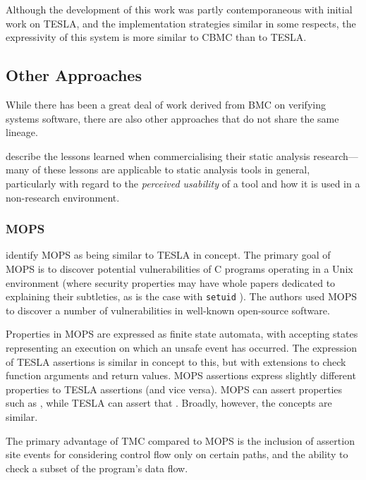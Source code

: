 Although the development of this work was partly contemporaneous with
initial work on TESLA, and the implementation strategies similar in some
respects, the expressivity of this system is more similar to CBMC than to TESLA.

\subsection{Other Approaches}

While there has been a great deal of work derived from BMC on verifying
systems software, there are also other approaches that do not share the
same lineage. 

\textcite{bessey_few_2010} describe the lessons learned when commercialising
their static analysis research---many of these lessons are applicable to static
analysis tools in general, particularly with regard to the \emph{perceived
usability} of a tool and how it is used in a non-research environment.

\subsubsection{MOPS}

\textcite{anderson_tesla:_2014} identify MOPS \cite{chen_mops:_2002} as being
similar to TESLA in concept. The primary goal of MOPS is to discover potential
vulnerabilities of C programs operating in a Unix environment (where security
properties may have whole papers dedicated to explaining their subtleties, as is
the case with \texttt{setuid} \cite{chen_setuid_2002}). The authors used
MOPS to discover a number of vulnerabilities in well-known open-source software.

Properties in MOPS are expressed as finite state automata, with accepting states
representing an execution on which an unsafe event has occurred. The expression
of TESLA assertions is similar in concept to this, but with extensions to check
function arguments and return values. MOPS assertions express slightly
different properties to TESLA assertions (and vice versa). MOPS can assert
properties such as , while TESLA can assert that
. Broadly, however, the concepts are similar.

The primary advantage of TMC compared to MOPS is the inclusion of assertion site
events for considering control flow only on certain paths, and the ability to
check a subset of the program's data flow.


